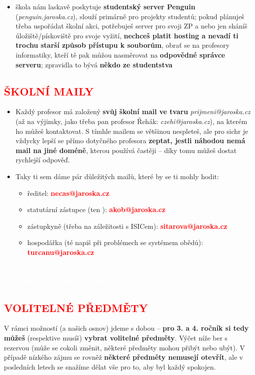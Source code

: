 \documentclass[a5paper, twoside]{article}
\newcommand{\polonadpis}[4]{
  \vspace*{-50pt}
  \begin{tcolorbox}[colback = #2, boxrule = 0pt, grow to left by = #4,  grow to right by = #4, arc=8pt, height = 30pt]
    \vspace*{5pt}
    \centering \subsection*{\textcolor{#3}{#1}}
  \end{tcolorbox}
}
\newcommand{\podnadpis}[2]{
  \subsection*{\textcolor{#2}{#1}}
}
\begin{document}
\begin{itemize}[leftmargin=10pt]
	\item  škola nám laskavě poskytuje \textbf{studentský server Penguin} (\textit{penguin.jaroska.cz}), slouží primárně pro projekty studentů; pokud plánuješ třeba uspořádat školní akci, potřebuješ server pro svoji ZP a nebo jen sháníš úložiště/pískoviště pro svoje vyžití, \textbf{nechceš platit hosting a nevadí ti trochu starší způsob přístupu k souborům}, obrať se na profesory informatiky, kteří tě pak můžou nasměrovat na \textbf{odpovědné správce serveru}; zpravidla to bývá \textbf{někdo ze studentstva}
\end{itemize}

\podnadpis{ŠKOLNÍ MAILY}{red}
\begin{itemize}[leftmargin=10pt]
	\item Každý profesor má založený \textbf{svůj školní mail ve tvaru} \textit{prijmeni@jaroska.cz} (až na výjimky, jako třeba pan profesor Řehák: \textit{czehi@jaroska.cz}), na kterém ho můžeš kontaktovat. S tímhle mailem se většinou nespleteš, ale pro sichr je vždycky lepší se přímo dotyčného profesora \textbf{zeptat, jestli náhodou nemá mail na jiné doméně}, kterou používá častěji -- díky tomu můžeš dostat rychlejší odpověď.
	\item  Taky ti sem dáme pár důležitých mailů, které by se ti mohly hodit:
	      \begin{itemize}[leftmargin=0pt]
		      \item  ředitel: \textcolor{red}{\textbf{necas@jaroska.cz}}
		      \item statutární zástupce (ten ): \textcolor{red}{\textbf{akob@jaroska.cz}}
		      \item zástupkyně (třeba na záležitosti s ISICem): \textcolor{red}{\textbf{sitarova@jaroska.cz}}
		      \item  hospodářka (té napiš při problémech se systémem obědů): \textcolor{red}{\textbf{turcanu@jaroska.cz}}
	      \end{itemize}
\end{itemize}

\newpage

\polonadpis{I. Jak to u nás chodí}{red}{white}{-4.1cm}

\podnadpis{VOLITELNÉ PŘEDMĚTY}{red}

\noindent V rámci možností (a našich osnov) jdeme s dobou -- \textbf{pro 3. a 4. ročník si tedy
	můžeš} (respektive musíš) \textbf{vybrat volitelné předměty}. Výčet níže ber s rezervou
(může se cokoli změnit, některé předměty mohou přibýt nebo ubýt). V případě
nízkého zájmu se rovněž \textbf{některé předměty nemusejí otevřít}, ale v posledních
letech se snažíme dělat vše pro to, aby byl každý spokojen.
\end{document}

